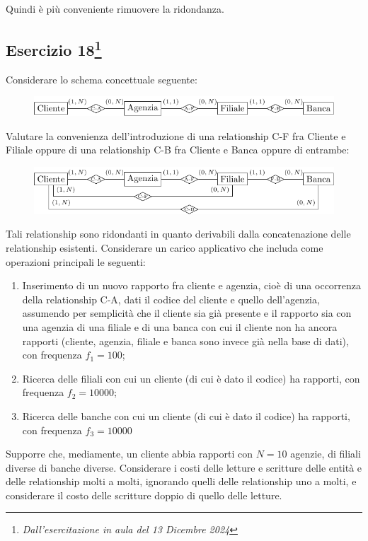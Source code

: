 \documentclass{article}
\begin{document}
Quindi è più conveniente rimuovere la ridondanza. 

\subsection{Esercizio 18\footnote{\textit{Dall'esercitazione in aula del 13 Dicembre 2024}}}

Considerare lo schema concettuale seguente:
\begin{figure}[H]%
    \centering%
    \includegraphics[scale=1.1]{ridondanza_13-12-24.pdf}%
\end{figure}

Valutare la convenienza dell'introduzione di una relationship C-F fra Cliente e Filiale oppure di una relationship 
C-B fra Cliente e Banca oppure di entrambe:

\begin{figure}[H]%
    \centering%
    \includegraphics[scale=1.1]{ridondanza_aggiunte_13-12-24.pdf}%
\end{figure}

Tali relationship sono ridondanti in quanto derivabili dalla 
concatenazione delle relationship esistenti. Considerare un carico applicativo che includa come operazioni 
principali le seguenti:
\begin{enumerate}
    \item Inserimento di un nuovo rapporto fra cliente e agenzia, cioè di una occorrenza della relationship C-A, 
    dati il codice del cliente e quello dell'agenzia, assumendo per semplicità che il cliente sia già presente e il
    rapporto sia con una agenzia di una filiale e di una banca con cui il cliente non ha ancora rapporti (cliente,
    agenzia, filiale e banca sono invece già nella base di dati), con frequenza $f_1 = 100$;
    \item Ricerca delle filiali con cui un cliente (di cui è dato il codice) ha rapporti, con frequenza $f_2 = 10000$;
    \item Ricerca delle banche con cui un cliente (di cui è dato il codice) ha rapporti, con frequenza $f_3 = 10000$ 
\end{enumerate}
Supporre che, mediamente, un cliente abbia rapporti con $N = 10$ agenzie, di filiali diverse di banche diverse. 
Considerare i costi delle letture e scritture delle entità e delle relationship molti a molti, ignorando quelli delle 
relationship uno a molti, e considerare il costo delle scritture doppio di quello delle letture. 
\end{document}
